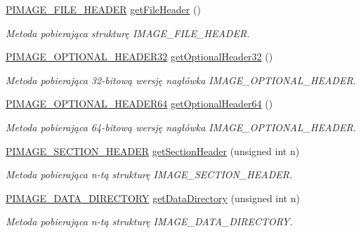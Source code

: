 \begin{DoxyCompactItemize}
\hyperlink{winheader_8h_ad59939d555bb89d353f970635be236ea}{P\-I\-M\-A\-G\-E\-\_\-\-F\-I\-L\-E\-\_\-\-H\-E\-A\-D\-E\-R} \hyperlink{class_p_e_file_a9779bdd02a58e6ea2db36eb193f9ffc7}{get\-File\-Header} ()
\begin{DoxyCompactList}\small\item\em Metoda pobierająca strukturę I\-M\-A\-G\-E\-\_\-\-F\-I\-L\-E\-\_\-\-H\-E\-A\-D\-E\-R. \end{DoxyCompactList}\item 
\hyperlink{winheader_8h_a3c22e256ff6db46507cdd956477cc106}{P\-I\-M\-A\-G\-E\-\_\-\-O\-P\-T\-I\-O\-N\-A\-L\-\_\-\-H\-E\-A\-D\-E\-R32} \hyperlink{class_p_e_file_a7a58a8b45e351c4aa260a604122ff7d5}{get\-Optional\-Header32} ()
\begin{DoxyCompactList}\small\item\em Metoda pobierająca 32-\/bitową wersję nagłówka I\-M\-A\-G\-E\-\_\-\-O\-P\-T\-I\-O\-N\-A\-L\-\_\-\-H\-E\-A\-D\-E\-R. \end{DoxyCompactList}\item 
\hyperlink{winheader_8h_a139717379813761e8b84795ce6e85b69}{P\-I\-M\-A\-G\-E\-\_\-\-O\-P\-T\-I\-O\-N\-A\-L\-\_\-\-H\-E\-A\-D\-E\-R64} \hyperlink{class_p_e_file_ad40c792d0076f06a503f550fb01e37c7}{get\-Optional\-Header64} ()
\begin{DoxyCompactList}\small\item\em Metoda pobierająca 64-\/bitową wersję nagłówka I\-M\-A\-G\-E\-\_\-\-O\-P\-T\-I\-O\-N\-A\-L\-\_\-\-H\-E\-A\-D\-E\-R. \end{DoxyCompactList}\item 
\hyperlink{winheader_8h_a47626b2fa073ef74937a4c5bf44104e2}{P\-I\-M\-A\-G\-E\-\_\-\-S\-E\-C\-T\-I\-O\-N\-\_\-\-H\-E\-A\-D\-E\-R} \hyperlink{class_p_e_file_aa78066badcca992f9d4c3d3b6fae41bf}{get\-Section\-Header} (unsigned int n)
\begin{DoxyCompactList}\small\item\em Metoda pobierająca n-\/tą strukturę I\-M\-A\-G\-E\-\_\-\-S\-E\-C\-T\-I\-O\-N\-\_\-\-H\-E\-A\-D\-E\-R. \end{DoxyCompactList}\item 
\hyperlink{winheader_8h_aa9458b3977365bbd4f380d0ab283084a}{P\-I\-M\-A\-G\-E\-\_\-\-D\-A\-T\-A\-\_\-\-D\-I\-R\-E\-C\-T\-O\-R\-Y} \hyperlink{class_p_e_file_aaf46e49176cedd59ea9ae063a817ddb9}{get\-Data\-Directory} (unsigned int n)
\begin{DoxyCompactList}\small\item\em Metoda pobierająca n-\/tą strukturę I\-M\-A\-G\-E\-\_\-\-D\-A\-T\-A\-\_\-\-D\-I\-R\-E\-C\-T\-O\-R\-Y. \end{DoxyCompactList}\item 

\end{DoxyCompactItemize}

